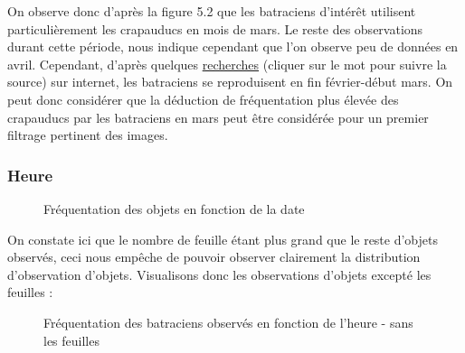 \noindent On observe donc d'après la figure 5.2 que les batraciens d'intérêt utilisent particulièrement les crapauducs en mois de mars. Le reste des observations durant cette période, nous indique cependant que l'on observe peu de données en avril. \newline
Cependant, d'après quelques \href{http://www.karch.ch/karch/home/amphibien/osservazione-di-anfibi.html}{recherches} (cliquer sur le mot pour suivre la source) sur internet, les batraciens se reproduisent en fin février-début mars. On peut donc considérer que la déduction de fréquentation plus élevée des crapauducs par les batraciens en mars peut être considérée pour un premier filtrage pertinent des images.

\subsubsection{Heure}

\begin{figure}[!htb]
    \centering
    \caption{Fréquentation des objets en fonction de la date}
    \label{fig:Fréquentation des objets en fonction de la date}
\end{figure}

On constate ici que le nombre de feuille étant plus grand que le reste d'objets observés, ceci nous empêche de pouvoir observer clairement la distribution d'observation d'objets. Visualisons donc les observations d'objets excepté les feuilles :

\begin{figure}[!htb]
    \centering
    \caption{Fréquentation des batraciens observés en fonction de l'heure - sans les feuilles}
    \label{fig:Fréquentation des crapauducs en fonction de l'heure - sans les feuilles}
\end{figure}

